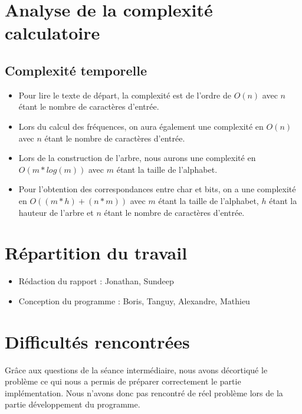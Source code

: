 \documentclass[11pt]{article}
\begin{document}
\section{Analyse de la complexité calculatoire}
\subsection{Complexité temporelle}
\begin{itemize}
\item Pour lire le texte de départ, la complexité est de l'ordre de $O(n)$ avec $n$ étant le nombre de caractères d'entrée.
\item Lors du calcul des fréquences, on aura également une complexité en $O(n)$ avec $n$ étant le nombre de caractères d'entrée.
\item Lors de la construction de l'arbre, nous aurons une complexité en $O(m*log(m))$ avec $m$ étant la taille de l'alphabet.
\item Pour l'obtention des correspondances entre char et bits, on a une complexité en $O((m*h)+(n*m))$ avec $m$ étant la taille de l'alphabet, $h$ étant la hauteur de l'arbre et $n$ étant le nombre de caractères d'entrée.
\end{itemize}

\section{Répartition du travail}

\begin{itemize}
\item Rédaction du rapport : Jonathan, Sundeep
\item Conception du programme : Boris, Tanguy, Alexandre, Mathieu
\end{itemize}

\section{Difficultés rencontrées}
Grâce aux questions de la séance intermédiaire, nous avons décortiqué le problème ce qui nous a permis de préparer correctement le partie implémentation. Nous n'avons donc pas rencontré de réel problème lors de la partie développement du programme.
\end{document}
